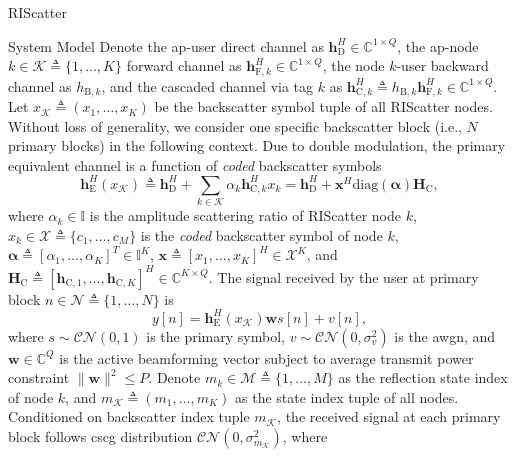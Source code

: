 \documentclass[journal]{IEEEtran}
\begin{document}
\begin{section}{RIScatter}
\begin{subsection}{System Model}
		Denote the \gls{ap}-user direct channel as $\boldsymbol{h}_{\mathrm{D}}^H \in \mathbb{C}^{1 \times Q}$, the \gls{ap}-node $k \in \mathcal{K} \triangleq \{1,\ldots,K\}$ forward channel as $\boldsymbol{h}_{\mathrm{F},k}^H \in \mathbb{C}^{1 \times Q}$, the node $k$-user backward channel as $h_{\mathrm{B},k}$, and the cascaded channel via tag $k$ as $\boldsymbol{h}_{\mathrm{C},k}^H \triangleq h_{\mathrm{B},k} \boldsymbol{h}_{\mathrm{F},k}^H \in \mathbb{C}^{1 \times Q}$.
		Let $x_{\mathcal{K}} \triangleq (x_1,\ldots,x_K)$ be the backscatter symbol tuple of all RIScatter nodes.
		Without loss of generality, we consider one specific backscatter block (i.e., $N$ primary blocks) in the following context.
		Due to double modulation, the primary equivalent channel is a function of \emph{coded} backscatter symbols
		\begin{equation}
			\boldsymbol{h}_{\mathrm{E}}^H(x_{\mathcal{K}}) \triangleq \boldsymbol{h}_{\mathrm{D}}^H + \sum_{k \in \mathcal{K}} \alpha_k \boldsymbol{h}_{\mathrm{C},k}^H x_k = \boldsymbol{h}_{\mathrm{D}}^H + \boldsymbol{x}^H \mathrm{diag}(\boldsymbol{\alpha}) \boldsymbol{H}_{\mathrm{C}},
			\label{eq:equivalent_channel}
		\end{equation}
		where $\alpha_k \in \mathbb{I}$ is the amplitude scattering ratio of RIScatter node $k$, $x_k \in \mathcal{X} \triangleq \{c_1,\ldots,c_M\}$ is the \emph{coded} backscatter symbol of node $k$, $\boldsymbol{\alpha} \triangleq [\alpha_1,\ldots,\alpha_K]^T \in \mathbb{I}^{K}$, $\boldsymbol{x} \triangleq [x_1,\ldots,x_K]^H \in \mathcal{X}^{K}$, and $\boldsymbol{H}_{\mathrm{C}} \triangleq [\boldsymbol{h}_{\mathrm{C},1},\ldots,\boldsymbol{h}_{\mathrm{C},K}]^H \in \mathbb{C}^{K \times Q}$. The signal received by the user at primary block $n \in \mathcal{N} \triangleq \{1,\ldots,N\}$ is
		\begin{equation}
			y[n] = \boldsymbol{h}_{\mathrm{E}}^H(x_{\mathcal{K}}) \boldsymbol{w} s[n] + v[n],
			\label{eq:receive_signal}
		\end{equation}
		where $s \sim \mathcal{CN}(0,1)$ is the primary symbol, $v \sim \mathcal{CN}(0,\sigma_v^2)$ is the \gls{awgn}, and $\boldsymbol{w} \in \mathbb{C}^{Q}$ is the active beamforming vector subject to average transmit power constraint $\lVert \boldsymbol{w} \rVert^2 \le P$.
		Denote $m_k \in \mathcal{M} \triangleq \{1,\ldots,M\}$ as the reflection state index of node $k$, and $m_{\mathcal{K}} \triangleq (m_1,\ldots,m_K)$ as the state index tuple of all nodes.
		Conditioned on backscatter index tuple $m_{\mathcal{K}}$, the received signal at each primary block follows \gls{cscg} distribution $\mathcal{CN}(0,\sigma_{m_{\mathcal{K}}}^2)$, where

\end{subsection}
\end{section}
\end{document}
